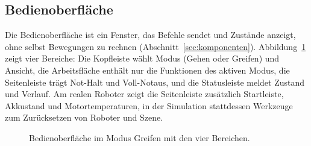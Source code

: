 
\subsection{Bedienoberfläche}
\label{sec:bedienoberflaeche}
Die Bedienoberfläche ist ein Fenster, das Befehle sendet und Zustände anzeigt, ohne selbst Bewegungen zu rechnen (Abschnitt~\ref{sec:komponenten}).
Abbildung~\ref{fig:bedienoberflaeche} zeigt vier Bereiche: Die Kopfleiste wählt Modus (Gehen oder Greifen) und Ansicht, die Arbeitsfläche enthält nur die Funktionen des aktiven Modus, die Seitenleiste trägt Not-Halt und Voll-Notaus, und die Statusleiste meldet Zustand und Verlauf.
Am realen Roboter zeigt die Seitenleiste zusätzlich Startleiste, Akkustand und Motortemperaturen, in der Simulation stattdessen Werkzeuge zum Zurücksetzen von Roboter und Szene.

\begin{figure}[htbp]
  \centering
  \caption[Bedienoberfläche]{Bedienoberfläche im Modus Greifen mit den vier Bereichen.}
  \label{fig:bedienoberflaeche}
\end{figure}

